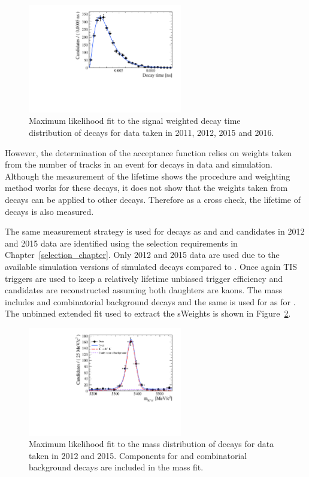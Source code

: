 \begin{figure}[htbp]
\centering
  \includegraphics[width=0.6\textwidth]{./Figs/LifetimeSystematics/Bd2KPi_lifetime_fit.pdf}
\caption{Maximum likelihood fit to the signal weighted decay time distribution of \bdkpi decays for data taken in 2011, 2012, 2015 and 2016. }
\label{fig:bdkpilifetimefit}
\end{figure}

However, the determination of the \bsmumu acceptance function relies on weights taken from the number of tracks in an event for \bdkpi decays in data and simulation. Although the measurement of the \bdkpi lifetime shows the procedure and weighting method works for these decays, it does not show that the weights taken from \bdkpi decays can be applied to other decays. Therefore as a cross check, the lifetime of \bskk decays is also measured. 

The same measurement strategy is used for \bskk decays as \bsmumu and \bdkpi and candidates in 2012 and 2015 data are identified using the selection requirements in Chapter~\ref{selection_chapter}. Only 2012 and 2015 data are used due to the available simulation versions of simulated \bskk decays compared to \bsmumu. Once again TIS triggers are used to keep a relatively lifetime unbiased trigger efficiency and candidates are reconstructed assuming both daughters are kaons. The mass \pdf includes \bskk and combinatorial background decays and the same \pdf is used for \bskk as for \bskpi. The unbinned extended \ml fit used to extract the sWeights is shown in Figure~\ref{fig:bskkmassfit}. 

\begin{figure}[htbp]
\centering
  \includegraphics[width=0.6\textwidth]{./Figs/LifetimeSystematics/Bs2KK_mass_fit.pdf}
\caption{Maximum likelihood fit to the mass distribution of \bskk decays for data taken in 2012 and 2015. Components for \bskk and combinatorial background decays are included in the mass fit. }
\label{fig:bskkmassfit}
\end{figure}


